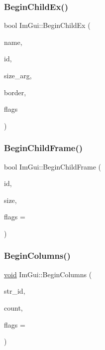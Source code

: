 \subsubsection{\texorpdfstring{Begin\+Child\+Ex()}{BeginChildEx()}}
{\footnotesize\ttfamily bool Im\+Gui\+::\+Begin\+Child\+Ex (\begin{DoxyParamCaption}\item[{const char $\ast$}]{name,  }\item[{Im\+Gui\+ID}]{id,  }\item[{const \hyperlink{structImVec2}{Im\+Vec2} \&}]{size\+\_\+arg,  }\item[{bool}]{border,  }\item[{Im\+Gui\+Window\+Flags}]{flags }\end{DoxyParamCaption})}

\mbox{\label{namespaceImGui_a0565e1ef69c897b1f30f37f95dd787f1}} 
\subsubsection{\texorpdfstring{Begin\+Child\+Frame()}{BeginChildFrame()}}
{\footnotesize\ttfamily bool Im\+Gui\+::\+Begin\+Child\+Frame (\begin{DoxyParamCaption}\item[{Im\+Gui\+ID}]{id,  }\item[{const \hyperlink{structImVec2}{Im\+Vec2} \&}]{size,  }\item[{Im\+Gui\+Window\+Flags}]{flags = {} }\end{DoxyParamCaption})}

\mbox{\label{namespaceImGui_a303fae66ef07f4f86ab242cf81021060}} 
\subsubsection{\texorpdfstring{Begin\+Columns()}{BeginColumns()}}
{\footnotesize\ttfamily \hyperlink{imgui__impl__opengl3__loader_8h_ac668e7cffd9e2e9cfee428b9b2f34fa7}{void} Im\+Gui\+::\+Begin\+Columns (\begin{DoxyParamCaption}\item[{const char $\ast$}]{str\+\_\+id,  }\item[{int}]{count,  }\item[{\hyperlink{imgui__internal_8h_a930931ec4c54582a278a461676df4dda}{Im\+Gui\+Old\+Column\+Flags}}]{flags = {} }\end{DoxyParamCaption})}

